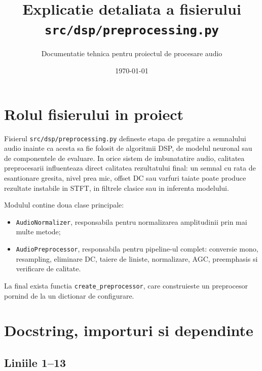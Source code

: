 \documentclass[12pt,a4paper]{report}
\title{Explicatie detaliata a fisierului \texttt{src/dsp/preprocessing.py}}
\author{Documentatie tehnica pentru proiectul de procesare audio}
\date{\today}
\newcommand{\codechunk}[2]{
    
}
\begin{document}
\maketitle
\tableofcontents

\chapter{Rolul fisierului in proiect}

Fisierul \texttt{src/dsp/preprocessing.py} defineste etapa de pregatire a semnalului audio inainte ca acesta sa fie folosit de algoritmii DSP, de modelul neuronal sau de componentele de evaluare. In orice sistem de imbunatatire audio, calitatea preprocesarii influenteaza direct calitatea rezultatului final: un semnal cu rata de esantionare gresita, nivel prea mic, offset DC sau varfuri taiate poate produce rezultate instabile in STFT, in filtrele clasice sau in inferenta modelului.

Modulul contine doua clase principale:

\begin{itemize}
    \item \texttt{AudioNormalizer}, responsabila pentru normalizarea amplitudinii prin mai multe metode;
    \item \texttt{AudioPreprocessor}, responsabila pentru pipeline-ul complet: conversie mono, resampling, eliminare DC, taiere de liniste, normalizare, AGC, preemphasis si verificare de calitate.
\end{itemize}

La final exista functia \texttt{create\_preprocessor}, care construieste un preprocesor pornind de la un dictionar de configurare.

\chapter{Docstring, importuri si dependinte}

\section{Liniile 1--13}

\codechunk{1}{13}
\end{document}
